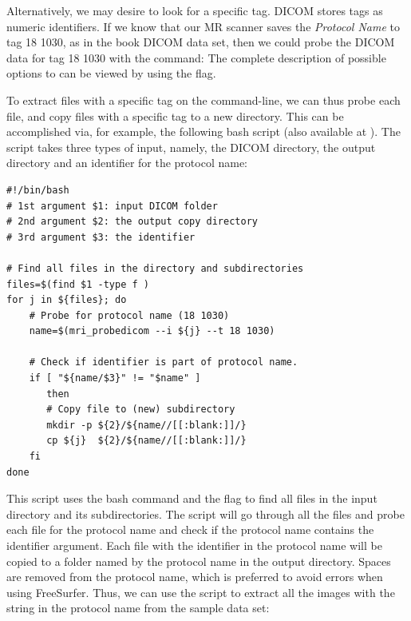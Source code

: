 \noindent Alternatively, we may desire to look for a specific tag.  DICOM stores 
tags as numeric identifiers.  If we know that our MR scanner saves the 
\textit{Protocol Name} to tag 18 1030, as in the book DICOM data set, then we 
could probe the DICOM data for tag 18 1030 with the command:
%
\noindent The complete description of possible options to
 can be viewed by using the  flag.

To extract files with a specific tag on the command-line, we can thus
probe each file, and copy files with a specific tag to a new
directory. This can be accomplished via, for example, the following bash script
(also available at ). The script
takes three types of input, namely, the DICOM directory, the output directory and
an identifier for the protocol name:
\begin{lstlisting}[style=bashStyle]
#!/bin/bash
# 1st argument $1: input DICOM folder
# 2nd argument $2: the output copy directory
# 3rd argument $3: the identifier 

# Find all files in the directory and subdirectories
files=$(find $1 -type f ) 
for j in ${files}; do
    # Probe for protocol name (18 1030)
    name=$(mri_probedicom --i ${j} --t 18 1030) 

    # Check if identifier is part of protocol name.
    if [ "${name/$3}" != "$name" ]
       then
       # Copy file to (new) subdirectory 
       mkdir -p ${2}/${name//[[:blank:]]/}  
       cp ${j}  ${2}/${name//[[:blank:]]/} 
    fi
done
\end{lstlisting}

This script uses the bash command  and the flag  to find all files in the input directory and its
subdirectories. The script will go through all the files and probe
each file for the protocol name and check if the protocol name
contains the identifier argument. Each file with the identifier in the
protocol name will be copied to a folder named by the protocol name in
the output directory. Spaces are removed from the protocol name, which is preferred to avoid errors when using FreeSurfer.
Thus, we can use the script to extract all the images with the 
string in the protocol name from the sample data set:

